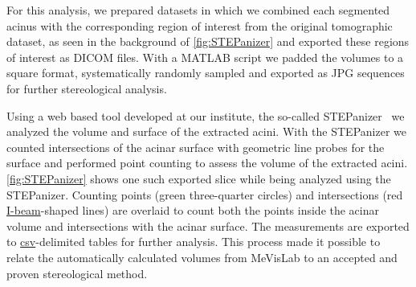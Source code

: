 \documentclass[%
	twoside,
	paper=a4,%
	abstract=true,%
	]{scrartcl}
\begin{document}
For this analysis, we prepared datasets in which we combined each segmented acinus with the corresponding region of interest from the original tomographic dataset, as seen in the background of \autoref{fig:STEPanizer} and exported these regions of interest as DICOM files. With a MATLAB script we padded the volumes to a square format, systematically randomly sampled and exported as JPG sequences for further stereological analysis.

Using a web based tool developed at our institute, the so-called STEPanizer~\cite[available free of charge at \url{http://stepanizer.com}]{Tschanz2011} we analyzed the volume and surface of the extracted acini. With the STEPanizer we counted intersections of the acinar surface with geometric line probes for the surface and performed point counting to assess the volume of the extracted acini. \autoref{fig:STEPanizer} shows one such exported slice while being analyzed using the STEPanizer. Counting points (green three-quarter circles) and intersections (red \href{https://encrypted.google.com/search?q=i-beam&tbm=isch}{I-beam}-shaped lines) are overlaid to count both the points inside the acinar volume and intersections with the acinar surface. The measurements are exported to \href{https://secure.wikimedia.org/wikipedia/en/w/index.php?title=Comma-separated_values&oldid=441921632}{csv}-delimited tables for further analysis. This process made it possible to relate the automatically calculated volumes from MeVisLab to an accepted and proven stereological method.
\end{document}
